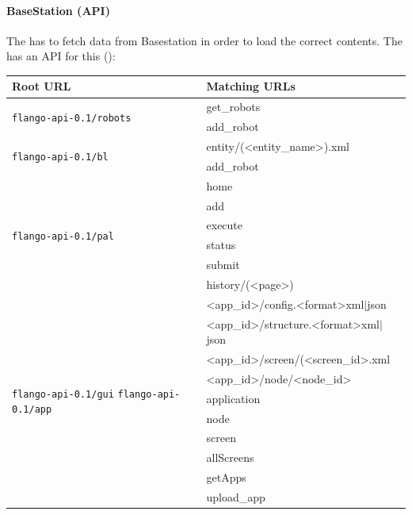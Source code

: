 \paragraph{BaseStation (\flangobe \ac{API})} The \cm has to fetch data from Basestation in order to load the correct contents.
The \flangobe has an \ac{API} for this ():

\begin{table}[ht]
    \centering
    \begin{tabularx}{\linewidth}{| l | X |}
    \hline
    Root URL & Matching URLs \\
    \hline
    \multirow{2}{*}{\texttt{flango-api-0.1/robots}}
        & get\_robots \\ 
        & add\_robot \\
    \hline 
    
    \multirow{2}{*}{\texttt{flango-api-0.1/bl}} 
        & entity/(\textless entity\_name\textgreater).xml \\ 
        & add\_robot \\
    \hline
    
    \multirow{6}{*}{\texttt{flango-api-0.1/pal}} 
        & home \\
        & add \\
        & execute \\
        & status \\   
        & submit \\
        & history/(\textless page\textgreater) \\
    \hline
    
    \multirow{10}{2.5cm}{\texttt{flango-api-0.1/gui}  \texttt{flango-api-0.1/app}}
        & \textless app\_id\textgreater /config.\textless format\textgreater xml$|$json \\
        & \textless app\_id\textgreater /structure.\textless format\textgreater xml$|$json \\
        & \textless app\_id\textgreater /screen/(\textless screen\_id\textgreater.xml \\
        & \textless app\_id\textgreater /node/\textless node\_id\textgreater \\
        & application \\
        & node \\
        & screen \\
        & allScreens \\
        & getApps \\
        & upload\_app \\
    \hline
    

\end{tabularx}
\end{table}
